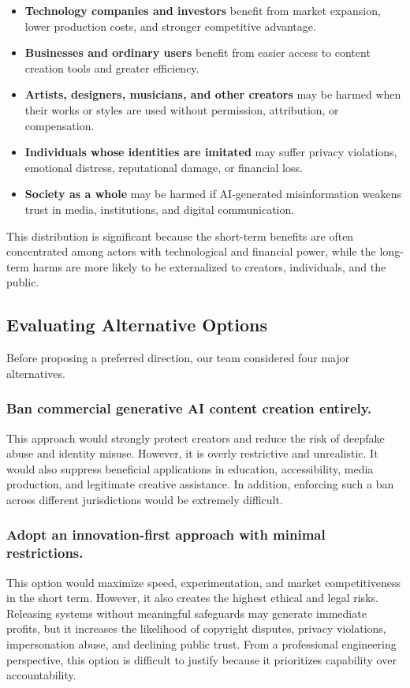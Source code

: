 \begin{itemize}
  \item \textbf{Technology companies and investors} benefit from market expansion, lower production costs, and stronger competitive advantage.
  \item \textbf{Businesses and ordinary users} benefit from easier access to content creation tools and greater efficiency.
  \item \textbf{Artists, designers, musicians, and other creators} may be harmed when their works or styles are used without permission, attribution, or compensation.
  \item \textbf{Individuals whose identities are imitated} may suffer privacy violations, emotional distress, reputational damage, or financial loss.
  \item \textbf{Society as a whole} may be harmed if AI-generated misinformation weakens trust in media, institutions, and digital communication.
\end{itemize}

This distribution is significant because the short-term benefits are often concentrated among actors with technological and financial power, while the long-term harms are more likely to be externalized to creators, individuals, and the public.

\subsection{Evaluating Alternative Options}
Before proposing a preferred direction, our team considered four major alternatives.

\subsubsection{Ban commercial generative AI content creation entirely.}
This approach would strongly protect creators and reduce the risk of deepfake abuse and identity misuse. However, it is overly restrictive and unrealistic. It would also suppress beneficial applications in education, accessibility, media production, and legitimate creative assistance. In addition, enforcing such a ban across different jurisdictions would be extremely difficult.

\subsubsection{Adopt an innovation-first approach with minimal restrictions.}
This option would maximize speed, experimentation, and market competitiveness in the short term. However, it also creates the highest ethical and legal risks. Releasing systems without meaningful safeguards may generate immediate profits, but it increases the likelihood of copyright disputes, privacy violations, impersonation abuse, and declining public trust. From a professional engineering perspective, this option is difficult to justify because it prioritizes capability over accountability.

